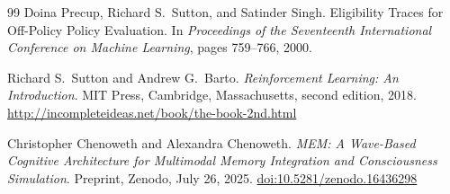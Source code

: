 \documentclass[11pt]{article}
\begin{document}
\begin{thebibliography}{99}
Doina Precup, Richard S.\ Sutton, and Satinder Singh.
\newblock Eligibility Traces for Off-Policy Policy Evaluation.
\newblock In \textit{Proceedings of the Seventeenth International
Conference on Machine Learning}, pages 759--766, 2000.

Richard S.\ Sutton and Andrew G.\ Barto.
\newblock \textit{Reinforcement Learning: An Introduction}.
\newblock MIT Press, Cambridge, Massachusetts, second edition, 2018.
\newblock \url{http://incompleteideas.net/book/the-book-2nd.html}

Christopher Chenoweth and Alexandra Chenoweth.
\newblock \textit{MEM: A Wave-Based Cognitive Architecture for
Multimodal Memory Integration and Consciousness Simulation}.
\newblock Preprint, Zenodo, July 26, 2025.
\newblock \href{https://doi.org/10.5281/zenodo.16436298}
{doi:10.5281/zenodo.16436298}

\end{thebibliography}
\end{document}
